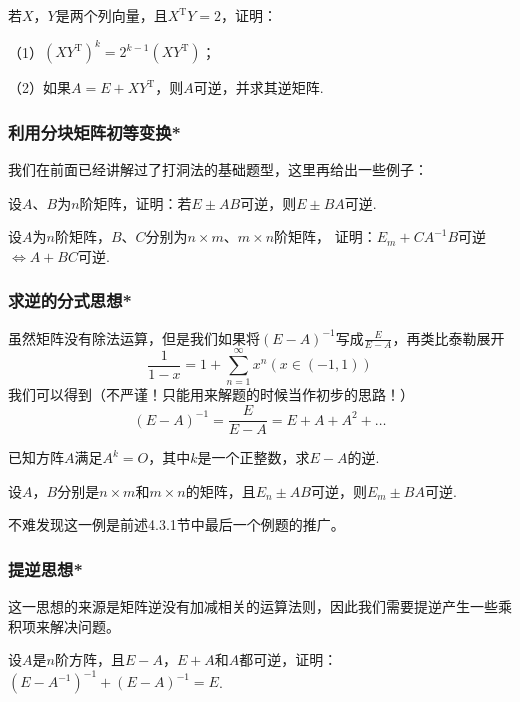 \begin{example}
	若$X$，$Y$是两个列向量，且$X^\mathrm{T}Y=2$，证明：

	\textup{（1）}$(XY^\mathrm{T})^k=2^{k-1}(XY^{\mathrm{T}})$；

	\textup{（2）}如果$A=E+XY^\mathrm{T}$，则$A$可逆，并求其逆矩阵.

\end{example}

\subsubsection{利用分块矩阵初等变换*}
我们在前面已经讲解过了打洞法的基础题型，这里再给出一些例子：
\begin{example}
	设$A$、$B$为$n$阶矩阵，证明：若$E\pm AB$可逆，则$E\pm BA$可逆.
\end{example}
\begin{example}
	设$A$为$n$阶矩阵，$B$、$C$分别为$n \times m$、$m \times n$阶矩阵，
	证明：$E_m+CA^{-1}B$可逆$\iff A+BC$可逆.
\end{example}

\subsubsection{求逆的分式思想*}
虽然矩阵没有除法运算，但是我们如果将$(E-A)^{-1}$写成$\frac{E}{E-A}$，再类比泰勒展开
$$\frac{1}{1-x}=1+\sum_{n=1}^\infty x^n(x\in (-1,1))$$我们可以得到（不严谨！只能用来解题的时候当作初步的思路！）
$$(E-A)^{-1}=\frac{E}{E-A}=E+A+A^2+\dots$$

\begin{example}
	已知方阵$A$满足$A^k=O$，其中$k$是一个正整数，求$E-A$的逆.
\end{example}

\begin{example}
	设$A$，$B$分别是$n \times m$和$m \times n$的矩阵，且$E_n \pm AB$可逆，则$E_m \pm BA$可逆.
\end{example}
不难发现这一例是前述4.3.1节中最后一个例题的推广。

\subsubsection{提逆思想*}
这一思想的来源是矩阵逆没有加减相关的运算法则，因此我们需要提逆产生一些乘积项来解决问题。
\begin{example}
	设$A$是$n$阶方阵，且$E-A$，$E+A$和$A$都可逆，证明：$(E-A^{-1})^{-1}+(E-A)^{-1}=E$.
\end{example}


